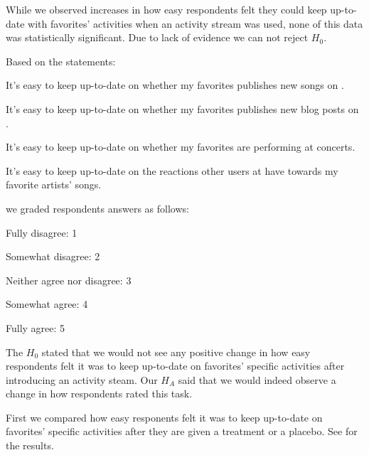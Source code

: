\parabreak

While we observed increases in how easy respondents felt they could keep
up-to-date with favorites' activities when an activity stream was used,
none of this data was statistically significant. Due to lack of evidence we
can not reject $H_0$.


Based on the statements:
\begin{items}
  \item It's easy to keep up-to-date on whether my favorites publishes
    new songs on \urort{}.
  \item It's easy to keep up-to-date on whether my favorites publishes
    new blog posts on \urort{}.
  \item It's easy to keep up-to-date on whether my favorites are
    performing at concerts.
  \item It's easy to keep up-to-date on the reactions other users at
    \urort{} have towards my favorite artists' songs.
\end{items}

we graded respondents answers as follows:

\begin{items}
  \item Fully disagree: 1
  \item Somewhat disagree: 2
  \item Neither agree nor disagree: 3
  \item Somewhat agree: 4
  \item Fully agree: 5
\end{items}

The $H_0$ stated that we would not see any positive change in how easy
respondents felt it was to keep up-to-date on favorites' specific activities
after introducing an activity steam. Our $H_A$ said that we
would indeed observe a change in how respondents rated this task.

First we compared how easy responents felt it was to keep up-to-date on
favorites' specific activities after they are given a treatment
or a placebo.
See
 for the results.

